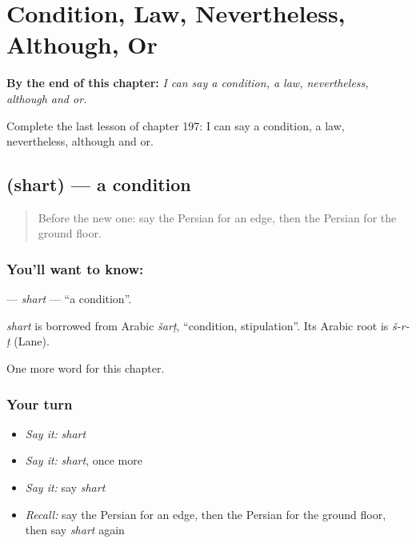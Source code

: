 
\chapter{Condition, Law, Nevertheless, Although, Or}
\label{ch:fa-condition-law-nevertheless-although-or}

\begin{chapteropening}
\textbf{By the end of this chapter:} \emph{I can say a condition, a law, nevertheless, although and or.}

Complete the last lesson of chapter 197: I can say a condition, a law, nevertheless, although and or.
\end{chapteropening}

\section[\texorpdfstring{\fa{شرط} (shart)}{شرط (shart)}]{ (shart) — a condition}

\label{lesson:FA-C197-shart}



\begin{quote}
Before the new one: say the Persian for an edge, then the Persian for the ground floor.
\end{quote}

\subsection*{You'll want to know: }
\textbf{} — \emph{shart} — \textquotedblleft{}a condition\textquotedblright{}.

\begin{cousinweb}
\emph{shart} is borrowed from Arabic \emph{šarṭ}, \textquotedblleft{}condition, stipulation\textquotedblright{}. Its Arabic root is \emph{š-r-ṭ} (Lane).
\end{cousinweb}

\begin{grammarlens}[title={What you've built}]
One more word for this chapter.
\end{grammarlens}

\subsection*{Your turn}
\begin{itemize}
\raggedright
  \item \emph{Say it:} \emph{shart}
  \item \emph{Say it:} \emph{shart}, once more
  \item \emph{Say it:} say \emph{shart}
  \item \emph{Recall:} say the Persian for an edge, then the Persian for the ground floor, then say \emph{shart} again
\end{itemize}


